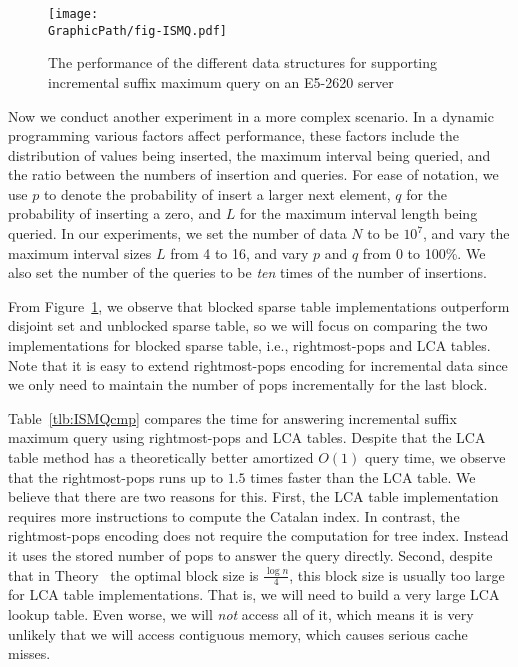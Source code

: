 \begin{figure}[!thb]
  \centering
  \texttt{[image: \\GraphicPath/fig-ISMQ.pdf]}
  \caption{The performance of the different data structures for
    supporting incremental suffix maximum query on an E5-2620 server}
  \label{fig:fig-ISMQcmp}
\end{figure}

Now we conduct another experiment in a more complex scenario.  In a
dynamic programming various factors affect performance, these factors
include the distribution of values being inserted, the maximum interval
being queried, and the ratio between the numbers of insertion and
queries.  For ease of notation, we use $p$ to denote the probability of
insert a larger next element, $q$ for the probability of inserting a
zero, and $L$ for the maximum interval length being queried.  In our
experiments, we set the number of data $N$ to be $10^7$, and vary the
maximum interval sizes $L$ from 4 to 16, and vary $p$ and $q$ from 0 to
100\%.  We also set the number of the queries to be {\em ten} times of
the number of insertions.

From Figure~\ref{fig:fig-ISMQcmp}, we observe that blocked sparse table
implementations outperform disjoint set and unblocked sparse table, so
we will focus on comparing the two implementations for blocked sparse
table, i.e., rightmost-pops and LCA tables.  Note that it is easy to
extend rightmost-pops encoding for incremental data since we only need
to maintain the number of pops incrementally for the last block.

Table~\ref{tlb:ISMQcmp} compares the time for answering incremental
suffix maximum query using rightmost-pops and LCA tables.  Despite that
the LCA table method has a theoretically better amortized $O(1)$ query
time, we observe that the rightmost-pops runs up to $1.5$ times faster
than the LCA table.  We believe that there are two reasons for this.
First, the LCA table implementation requires more instructions to
compute the Catalan index.  In contrast, the rightmost-pops encoding
does not require the computation for tree index.  Instead it uses the
stored number of pops to answer the query directly.  Second, despite
that in Theory~\cite{Fischer2006TheoreticalAP} the optimal block size is
$\frac{\log n}{4}$, this block size is usually too large for LCA table
implementations.  That is, we will need to build a very large LCA lookup
table.  Even worse, we will {\em not} access all of it, which means it
is very unlikely that we will access contiguous memory, which causes
serious cache misses.


